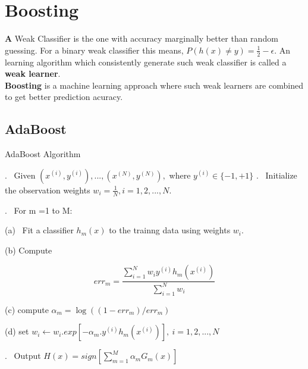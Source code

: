 \documentclass[12pt]{article}
\begin{document}
 \section{Boosting}
 \textbf A {Weak Classifier} is the one with accuracy marginally better than random guessing. For a binary  weak classifier this means, $P(h(x) \neq y) = \frac{1}{2} - \epsilon .$ An learning algorithm which consistently generate such weak classifier is called a \textbf{weak learner}.\\ \textbf{Boosting} is a machine learning approach where such weak learners are combined to get better prediction acuracy.\\



 \subsection{AdaBoost}
 
 
 \begin{algorithm}
 	
 	\caption*{AdaBoost Algorithm} \label{alg:MyAlgorithm}
 	\begin{algorithmic}
 		
 		. \ Given $(x^{(i)},y^{(i)}),...,(x^{(N)},y^{(N)}),$ where $y^{(i)}\in \{-1,+1\}$ 
 		. \  Initialize the observation weights $w_{i}= \frac{1}{N},i = 1,2,...,N.$
 		
 		. \ For m =1 to M:
 		
 		
 		
 		\STATE \hspace{ 0.8cm}(a) \ Fit a classifier $h_{m}(x)$ to the trainng data using weights $w_{i}.$
 		
 		\STATE \hspace{ 0.8cm}(b) Compute 
 		
 	
 		
 			$$err_{m} = \frac{\sum_{i=1}^{N}w_{i}y^{(i)}h_{m}(x^{(i)})}{\sum_{i=1}^{N} w_{i}}$$
 		
 		
 		
 			\STATE \hspace{ 0.8cm}(c) compute $\alpha_{m} = \log((1-err_{m})/err_{m})$
 			
 				\STATE \hspace{ 0.8cm}(d) set $w_{i} \leftarrow w_{i}.exp[-\alpha_{m}.y^{(i)}h_{m}(x^{(i)})], \ i = 1,2,...,N$
 				
 	. \ Output $H(x) = sign[\sum_{m=1}^{M}\alpha_{m}G_{m}(x)]$
 		
 		
 	\end{algorithmic}
 \end{algorithm}
 
\end{document}
